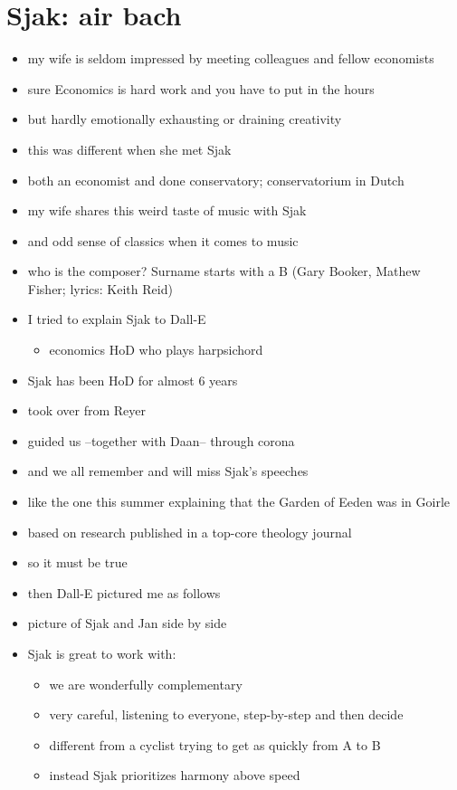 \documentclass[a4paper,12pt]{article}
\begin{document}
\section*{Sjak: air bach}
\label{sec:org3f816ce}
\begin{itemize}
\item my wife is seldom impressed by meeting colleagues and fellow economists
\item sure Economics is hard work and you have to put in the hours
\item but hardly emotionally exhausting or draining creativity
\item this was different when she met Sjak
\item both an economist and done conservatory; conservatorium in Dutch
\item my wife shares this weird taste of music with Sjak
\item and odd sense of classics when it comes to music
\item who is the composer? Surname starts with a B (Gary Booker, Mathew Fisher; lyrics: Keith Reid)

\item I tried to explain Sjak to Dall-E
\begin{itemize}
\item economics HoD who plays harpsichord
\end{itemize}

\item Sjak has been HoD for almost 6 years
\item took over from Reyer
\item guided us --together with Daan-- through corona
\item and we all remember and will miss Sjak's speeches
\item like the one this summer explaining that the Garden of Eeden was in Goirle
\item based on research published in a top-core theology journal
\item so it must be true

\item then Dall-E pictured me as follows
\item picture of Sjak and Jan side by side
\item Sjak is great to work with:
\begin{itemize}
\item we are wonderfully complementary
\item very careful, listening to everyone, step-by-step and then decide
\item different from a cyclist trying to get as quickly from A to B
\item instead Sjak prioritizes harmony above speed
\end{itemize}
\end{itemize}
\end{document}
